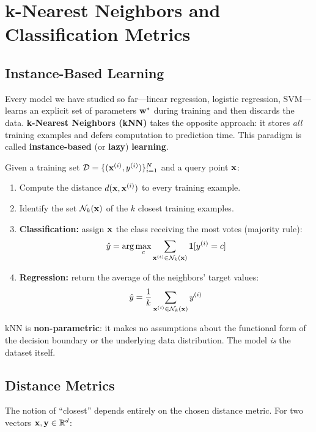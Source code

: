 \chapter*{k-Nearest Neighbors and Classification Metrics}

\section*{Instance-Based Learning}

Every model we have studied so far---linear regression, logistic regression, SVM---learns an explicit set of parameters $\mathbf{w}^*$ during training and then discards the data. \textbf{k-Nearest Neighbors (kNN)} takes the opposite approach: it stores \textit{all} training examples and defers computation to prediction time. This paradigm is called \textbf{instance-based} (or \textbf{lazy}) \textbf{learning}.

\begin{definition}
Given a training set $\mathcal{D} = \{(\mathbf{x}^{(i)}, y^{(i)})\}_{i=1}^{N}$ and a query point $\mathbf{x}$:
\begin{enumerate}
    \item Compute the distance $d(\mathbf{x}, \mathbf{x}^{(i)})$ to every training example.
    \item Identify the set $\mathcal{N}_k(\mathbf{x})$ of the $k$ closest training examples.
    \item \textbf{Classification:} assign $\mathbf{x}$ the class receiving the most votes (majority rule):
    $$\hat{y} = \arg\max_{c} \sum_{\mathbf{x}^{(i)} \in \mathcal{N}_k(\mathbf{x})} \mathbf{1}[y^{(i)} = c]$$
    \item \textbf{Regression:} return the average of the neighbors' target values:
    $$\hat{y} = \frac{1}{k} \sum_{\mathbf{x}^{(i)} \in \mathcal{N}_k(\mathbf{x})} y^{(i)}$$
\end{enumerate}
\end{definition}

kNN is \textbf{non-parametric}: it makes no assumptions about the functional form of the decision boundary or the underlying data distribution. The model \textit{is} the dataset itself.

\section*{Distance Metrics}

The notion of ``closest'' depends entirely on the chosen distance metric. For two vectors $\mathbf{x}, \mathbf{y} \in \mathbb{R}^d$:

